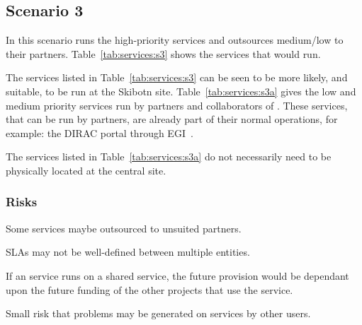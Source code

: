 \documentclass[12pt,a4paper]{article}
\newcommand{\nnt}{NeIC NT1\xspace}
\begin{document}

\subsection{Scenario 3}
\label{ssec:scen3}

In this scenario \EC runs the high-priority services and outsources medium/low to their partners.
Table~\ref{tab:services:s3} shows the services that \EC would run.

The services listed in Table~\ref{tab:services:s3} can be seen to be more likely, and suitable, to be run at the
Skibotn site.
Table~\ref{tab:services:s3a} gives the low and medium priority services run by partners and collaborators of \EC.
These services, that can be run by \EC partners, are already part of their normal operations, for example: the DIRAC portal through EGI~\cite{egi}.

The services listed in Table~\ref{tab:services:s3a} do not necessarily need to be physically located at the \ED central site. 
\subsubsection*{Risks}
\bitm
   \item {Some services maybe outsourced to unsuited partners.} %
   \item {SLAs may not be well-defined between multiple entities.}
   \item {If an \ED service runs on a shared service, the future provision would be dependant upon the future funding of the other projects that use the service.}
   \item {Small risk that problems may be generated on services by other users.}
\eitm
\end{document}
